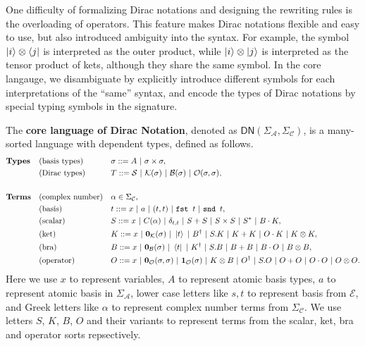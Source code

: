 One difficulty of formalizing Dirac notations and designing the rewriting rules is the overloading of operators. This feature makes Dirac notations flexible and easy to use, but also introduced ambiguity into the syntax. For example, the symbol $\ket{i} \otimes \bra{j}$ is interpreted as the outer product, while $\ket{i} \otimes \ket{j}$ is interpreted as the tensor product of kets, although they share the same symbol. 
In the core langauge, we disambiguate by explicitly introduce different symbols for each interpretations of the ``same'' syntax, and encode the types of Dirac notations by special typing symbols in the signature.

\begin{definition}
  The \textbf{core language of Dirac Notation}, denoted as $\textsf{DN}(\Sigma_\mathcal{A}, \Sigma_\mathcal{C})$, is a many-sorted language with dependent types, defined as follows.
  \begin{align*}
    & \textbf{Types} && \textrm{(basis types)} && \sigma ::= A\ |\ \sigma \times \sigma, \\
    & && \textrm{(Dirac types)} && T ::= \Sc\ |\ \K(\sigma)\ |\ \B(\sigma)\ |\ \Op(\sigma, \sigma), \\
    \\
    & \textbf{Terms} && \textrm{(complex number)} && \alpha \in \Sigma_\mathcal{C}, \\
    & && \textrm{(basis)} && t ::= x\ |\ a\ |\ (t, t)\ |\ \fst t\ |\ \snd t, \\
    & && \textrm{(scalar)} && S ::= x\ |\ C(\alpha)\ |\ \delta_{t, t}\ |\ S + S\ |\ S \times S\ |\ S^*\ |\ B \cdot K, \\
    & && \textrm{(ket)} && K ::= x\ |\ \mathbf{0}_\mathcal{K}(\sigma)\ |\ \ket{t}\ |\ B^\dagger\ |\ S.K\ |\ K + K\ |\ O \cdot K\ |\ K \otimes K, \\
    & && \textrm{(bra)} && B ::= x\ |\ \mathbf{0}_\mathcal{B}(\sigma)\ |\ \bra{t}\ |\ K^\dagger\ |\ S.B\ |\ B + B\ |\ B \cdot O\ |\ B \otimes B, \\
    & && \textrm{(operator)} && O ::= x\ |\ \mathbf{0}_\mathcal{O}(\sigma, \sigma)\ |\ \mathbf{1}_\mathcal{O}(\sigma)\ |\ K \otimes B\ |\ O^\dagger\ |\ S.O\ |\ O + O\ |\ O \cdot O\ |\ O \otimes O.
  \end{align*}
   Here we use $x$ to represent variables, $A$ to represent atomic basis types, $a$ to represent atomic basis in $\Sigma_\mathcal{A}$, lower case letters like $s, t$ to represent basis from $\mathcal{E}$, and Greek letters like $\alpha$ to represent complex number terms from $\Sigma_\mathcal{C}$. We use letters $S$, $K$, $B$, $O$ and their variants to represent terms from the scalar, ket, bra and operator sorts repsectively.
\end{definition}

